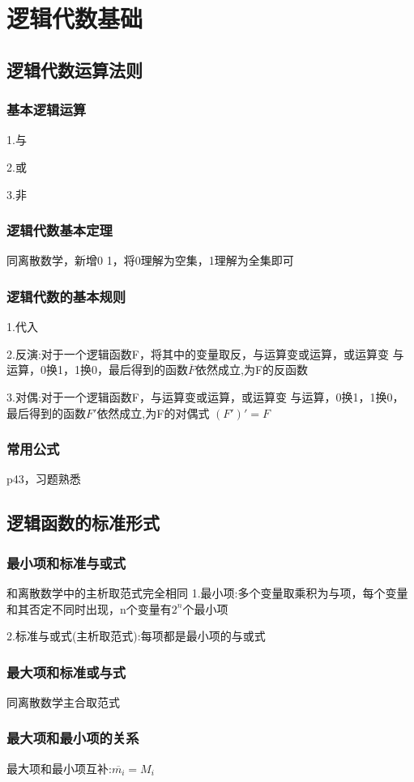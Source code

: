 \documentclass[11pt,twoside,a4paper]{ctexart}
\begin{document}
    \section{逻辑代数基础}
    \subsection{逻辑代数运算法则}
    \subsubsection{基本逻辑运算}
    1.与
    
    2.或

    3.非
    \subsubsection{逻辑代数基本定理}
    同离散数学，新增0 1，将0理解为空集，1理解为全集即可

    \subsubsection{逻辑代数的基本规则}
    1.代入

    2.反演:对于一个逻辑函数F，将其中的变量取反，与运算变或运算，或运算变
    与运算，0换1，1换0，最后得到的函数$\overline{F}$依然成立,为F的反函数

    3.对偶:对于一个逻辑函数F，与运算变或运算，或运算变
    与运算，0换1，1换0，最后得到的函数$F'$依然成立,为F的对偶式
    $(F')' = F$
    \subsubsection{常用公式}
    p43，习题熟悉
    \subsection{逻辑函数的标准形式}
    \subsubsection{最小项和标准与或式}
    和离散数学中的主析取范式完全相同
    1.最小项:多个变量取乘积为与项，每个变量和其否定不同时出现，n个变量有$2^n$个最小项

    2.标准与或式(主析取范式):每项都是最小项的与或式
    \subsubsection{最大项和标准或与式}
    同离散数学主合取范式
    \subsubsection{最大项和最小项的关系}
    最大项和最小项互补:$\overline{m_i} = M_i$
\end{document}

